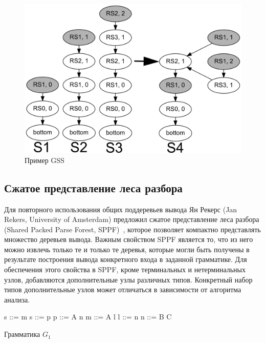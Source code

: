 \begin{figure}[H]
\begin{center}
\includegraphics[width=.8\textwidth]{pics/ex_gss.png}
\caption{Пример GSS}
\label{fig:gss} 
\end{center}
\end{figure}

\subsection{Сжатое представление леса разбора}

Для повторного использования общих поддеревьев вывода Ян Рекерс (Jan Rekers, University of Amsterdam) предложил сжатое представление леса разбора (Shared Packed Parse Forest, SPPF)~\cite{SPPF}, которое позволяет компактно представлять множество деревьев вывода. Важным свойством SPPF является то, что из него можно извлечь только те и только те деревья, которые могли быть получены в результате построения вывода конкретного входа в заданной грамматике. Для обеспечения этого свойства в SPPF, кроме терминальных и нетерминальных узлов, добавляются дополнительные узлы различных типов. Конкретный набор типов дополнительные узлов может отличаться в зависимости от алгоритма анализа.

\begin{listing}
    \begin{pyglist}[numbers=left,numbersep=5pt]

s ::= m 
s ::= p
p ::= A n
m ::= A l
l ::= n
n ::= B C

\end{pyglist}
\caption{Грамматика $G_1$}
\label{lst:g1}
\end{listing}



